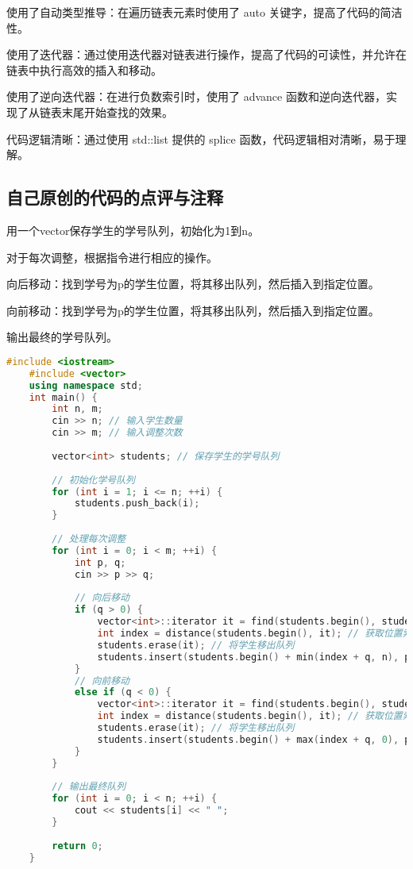 使用了自动类型推导：在遍历链表元素时使用了 auto 关键字，提高了代码的简洁性。

使用了迭代器：通过使用迭代器对链表进行操作，提高了代码的可读性，并允许在链表中执行高效的插入和移动。

使用了逆向迭代器：在进行负数索引时，使用了 advance 函数和逆向迭代器，实现了从链表末尾开始查找的效果。

代码逻辑清晰：通过使用 std::list 提供的 splice 函数，代码逻辑相对清晰，易于理解。

\subsection{自己原创的代码的点评与注释}

用一个vector保存学生的学号队列，初始化为1到n。

对于每次调整，根据指令进行相应的操作。

向后移动：找到学号为p的学生位置，将其移出队列，然后插入到指定位置。

向前移动：找到学号为p的学生位置，将其移出队列，然后插入到指定位置。

输出最终的学号队列。

\begin{lstlisting}[language=C++]
    #include <iostream>
    #include <vector>
    using namespace std;
    int main() {
        int n, m;
        cin >> n; // 输入学生数量
        cin >> m; // 输入调整次数
    
        vector<int> students; // 保存学生的学号队列
    
        // 初始化学号队列
        for (int i = 1; i <= n; ++i) {
            students.push_back(i);
        }
    
        // 处理每次调整
        for (int i = 0; i < m; ++i) {
            int p, q;
            cin >> p >> q;
    
            // 向后移动
            if (q > 0) {
                vector<int>::iterator it = find(students.begin(), students.end(), p); // 找到学号为p的学生的位置
                int index = distance(students.begin(), it); // 获取位置索引
                students.erase(it); // 将学生移出队列
                students.insert(students.begin() + min(index + q, n), p); // 插入到指定位置
            }
            // 向前移动
            else if (q < 0) {
                vector<int>::iterator it = find(students.begin(), students.end(), p); // 找到学号为p的学生的位置
                int index = distance(students.begin(), it); // 获取位置索引
                students.erase(it); // 将学生移出队列
                students.insert(students.begin() + max(index + q, 0), p); // 插入到指定位置
            }
        }
    
        // 输出最终队列
        for (int i = 0; i < n; ++i) {
            cout << students[i] << " ";
        }
    
        return 0;
    }    
\end{lstlisting}